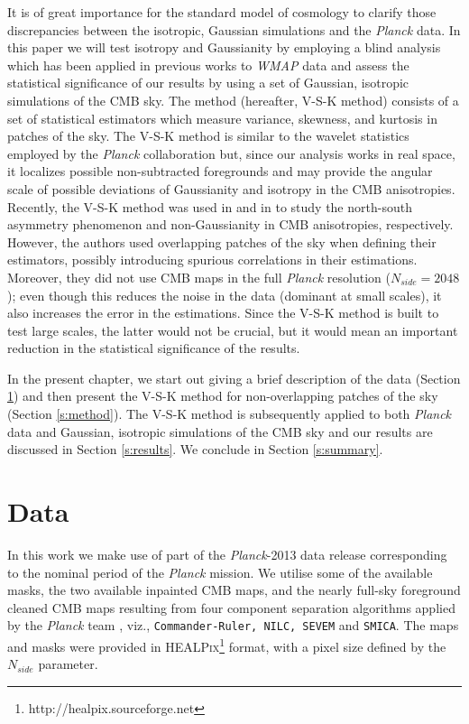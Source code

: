 It is of great importance for the standard model of cosmology to clarify those discrepancies between the isotropic, Gaussian simulations and the \textit{Planck} data. In this paper we will test isotropy and Gaussianity by employing a blind analysis which has been applied in previous works to \textit{WMAP} data and assess the statistical significance of our results by using a set of Gaussian, isotropic simulations of the CMB sky. The method (hereafter, V-S-K method) consists of a set of statistical estimators which measure variance, skewness, and kurtosis in patches of the sky. The V-S-K method is similar to the wavelet statistics employed by the \textit{Planck} collaboration but, since our analysis works in real space, it localizes possible non-subtracted foregrounds and may provide the angular scale of possible deviations of Gaussianity and isotropy in the CMB anisotropies. Recently, the V-S-K method was used in \cite{Bernui:2014oda} and in \cite{Bernui:2014gla} to study the north-south asymmetry phenomenon and non-Gaussianity in CMB anisotropies, respectively. However, the authors used overlapping patches of the sky when defining their estimators, possibly introducing spurious correlations in their estimations. Moreover, they did not use CMB maps in the full \textit{Planck} resolution ($N_{side}=2048$); even though this reduces the noise in the data (dominant at small scales), it also increases the error in the estimations. Since the V-S-K method is built to test large scales, the latter would not be crucial, but it would mean an important reduction in the statistical significance of the results.

In the present chapter, we start out giving a brief description of the data (Section \ref{s:data}) and then present the V-S-K method for non-overlapping patches of the sky (Section \ref{s:method}). The V-S-K method is subsequently applied to both \textit{Planck} data and Gaussian, isotropic simulations of the CMB sky and our results are discussed in Section \ref{s:results}. We conclude in Section \ref{s:summary}.

\section{Data}
\label{s:data}

In this work we make use of part of the \textit{Planck}-2013 data release corresponding to the nominal period of the \textit{Planck} mission. We utilise some of the available masks, the two available inpainted CMB maps, and the nearly full-sky foreground cleaned CMB maps resulting from four  component separation algorithms applied by the \textit{Planck} team \cite{Ade:2013crn}, viz., \texttt{Commander-Ruler, NILC, SEVEM} and \texttt{SMICA}. The maps and masks were provided in \textsc{HEALPix}\footnote{http://healpix.sourceforge.net} format, with a pixel size defined by the $N_{side}$ parameter. 

